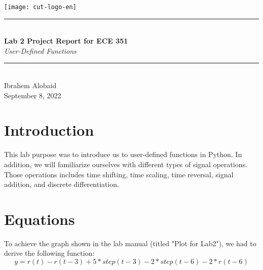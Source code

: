 \documentclass[12pt,a4paper]{article}
\newcommand{\HRule}{\rule{\linewidth}{0.5mm}}
\begin{document}
\begin{titlepage}
\begin{center}
\texttt{[image: cut-logo-en]}~\\[2cm]
\HRule \\[0.4cm]
{ \LARGE 
  \textbf{Lab 2 Project Report for ECE 351}\\[0.4cm]
  \emph{User-Defined Functions}\\[0.4cm]
}
\HRule \\[1.5cm]
{ \large
  Ibrahem Alobaid \\[0.1cm]
  September 8, 2022\\[0.1cm]
}
\vfill

\end{center}
\end{titlepage}
\newpage
\tableofcontents
{}
\newpage
\setcounter{page}{1}
\section{Introduction}\label{sec:intro}
This lab purpose was to introduce us to user-defined functions in Python. In addition, we will familiarize ourselves with different types of signal operations. Those operations includes time shifting, time scaling, time reversal, signal addition, and discrete differentiation.

\section{Equations}\label{sec:lit-rev}
To achieve the graph shown in the lab manual (titled "Plot for Lab2"), we had to derive the following function:
\begin{equation}
    y = r(t) - r(t-3) + 5*step(t-3) - 2*step(t-6) - 2*r(t-6)
\end{equation}
\end{document}
